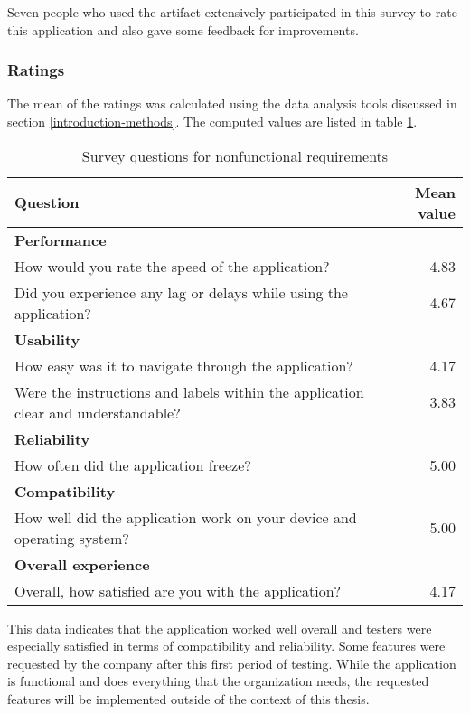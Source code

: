 Seven people who used the artifact extensively participated in this survey to rate this application and also gave some feedback for improvements.

\subsubsection{Ratings}

The mean of the ratings was calculated using the data analysis
tools discussed in section \ref{introduction-methods}.
The computed values are listed in table \ref{tab:tool-ratings}.

\begin{table}[!h]
    \centering
    \begin{tabular}{p{8cm} r}
    \hline
        \textbf{Question} & \textbf{Mean value} \\ 
     \hline
        \textbf{Performance} & \\
        How would you rate the speed of the application? & 4.83 \\
        Did you experience any lag or delays while using the application? & 4.67 \\
     \hline
        \textbf{Usability} & \\
        How easy was it to navigate through the application? & 4.17\\
        Were the instructions and labels within the application clear and understandable? & 3.83 \\
     \hline
        \textbf{Reliability} & \\
        How often did the application freeze? & 5.00 \\
     \hline
        \textbf{Compatibility} & \\
        How well did the application work on your device and operating system? & 5.00 \\
     \hline
        \textbf{Overall experience} & \\
        Overall, how satisfied are you with the application? & 4.17 \\
        
    \end{tabular}
    \caption{Survey questions for nonfunctional requirements}
    \label{tab:tool-ratings}
\end{table}

This data indicates that the application worked well overall and testers 
were especially satisfied in terms of compatibility and reliability. 
Some features were requested by the company after this first period of testing. 
While the application is functional and does everything that the organization needs, 
the requested features will be implemented outside of the context of this thesis. 
